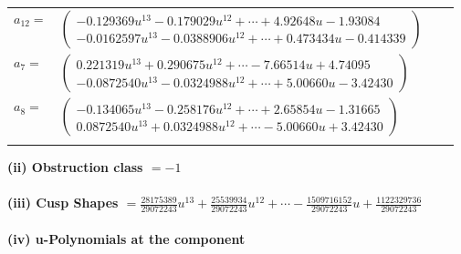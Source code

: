 \documentclass[1p]{elsarticle_modified}
\theoremstyle{definition}
\begin{document}
\begin{tabular}{m{7pt} m{180pt} m{7pt} m{180pt} }
\flushright $a_{12}=$&$\begin{pmatrix}-0.129369 u^{13}-0.179029 u^{12}+\cdots+4.92648 u-1.93084\\-0.0162597 u^{13}-0.0388906 u^{12}+\cdots+0.473434 u-0.414339\end{pmatrix}$ \\
\flushright $a_{7}=$&$\begin{pmatrix}0.221319 u^{13}+0.290675 u^{12}+\cdots-7.66514 u+4.74095\\-0.0872540 u^{13}-0.0324988 u^{12}+\cdots+5.00660 u-3.42430\end{pmatrix}$ \\
\flushright $a_{8}=$&$\begin{pmatrix}-0.134065 u^{13}-0.258176 u^{12}+\cdots+2.65854 u-1.31665\\0.0872540 u^{13}+0.0324988 u^{12}+\cdots-5.00660 u+3.42430\end{pmatrix}$\\&\end{tabular}
\flushleft \textbf{(ii) Obstruction class $= -1$}\\~\\
\flushleft \textbf{(iii) Cusp Shapes $= \frac{28175389}{29072243} u^{13}+\frac{25539934}{29072243} u^{12}+\cdots-\frac{1509716152}{29072243} u+\frac{1122329736}{29072243}$}\\~\\
\newpage\renewcommand{\arraystretch}{1}
\flushleft \textbf{(iv) u-Polynomials at the component}\newline \\
\end{document}
